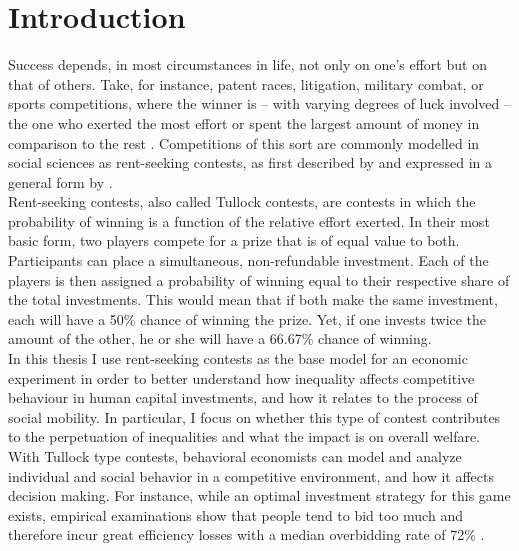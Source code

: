 \chapter{Introduction}
\thispagestyle{fancy}
\label{ch:intro}


Success depends, in most circumstances in life, not only on one's effort but on that of others. Take, for instance, patent races, litigation, military combat, or sports competitions, where the winner is -- with varying degrees of luck involved -- the one who exerted the most effort or spent the largest amount of money in comparison to the rest \citep{konrad2009}. Competitions of this sort are commonly modelled in social sciences as rent-seeking contests, as first described by \cite{tullock1980}  and expressed in a general form by \cite{sheremeta2010a}. \\

Rent-seeking contests, also called Tullock contests, are contests in which the probability of winning is a function of the relative effort exerted. In their most basic form, two players compete for a prize that is of equal value to both. Participants can place a simultaneous, non-refundable investment. Each of the players is then assigned a probability of winning equal to their respective share of the total investments. This would mean that if both make the same investment, each will have a 50\% chance of winning the prize. Yet, if one invests twice the amount of the other, he or she will have a 66.67\% chance of winning.\\ 

In this thesis I use rent-seeking contests as the base model for an economic experiment in order to better understand how inequality affects competitive behaviour in human capital investments, and how it relates to the process of social mobility. In particular, I focus on whether this type of contest contributes to the perpetuation of inequalities and what the impact is on overall welfare.\\

With Tullock type contests, behavioral economists can model and analyze individual and social behavior in a competitive environment, and how it affects decision making. For instance, while an optimal investment strategy for this game exists, empirical examinations show that people tend to bid too much and therefore incur great efficiency losses with a median overbidding rate of 72\% \citep{sheremeta2013, chowdhury2014, konrad2009, dechenaux2015}.\\

